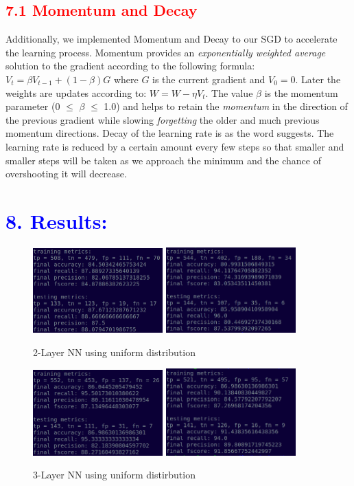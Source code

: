 \documentclass[a4paper,10pt,twocolumn]{article}
\begin{document}
\subsection*{\textcolor{red}{7.1 Momentum and Decay}}
Additionally, we implemented Momentum and Decay to our SGD to accelerate the learning process. Momentum provides an \textit{exponentially weighted average} solution to the gradient according to the following formula: $V_t = \beta V_{t-1} + (1 - \beta)G$ where $G$ is the current gradient and $V_0 = 0$. Later the weights are updates according to: $W = W - \eta V_t$. The value $\beta$ is the momentum parameter (0 $\leq$ $\beta$ $\leq$ 1.0) and helps to retain the \textit{momentum} in the direction of the previous gradient while slowing \textit{forgetting} the older and much previous momentum directions. Decay of the learning rate is as the word suggests. The learning rate is reduced by a certain amount every few steps so that smaller and smaller steps will be taken as we approach the minimum and the chance of overshooting it will decrease.

\newpage
\onecolumn
\section*{\textcolor{blue}{8. Results:}}
\begin{figure}[h!]
\centering
\includegraphics[scale=1.0, width=5cm]{Fig1.png}
\includegraphics[scale=1.0, width=5cm]{Fig2.png}
\caption*{2-Layer NN using uniform distribution}
\end{figure}

\begin{figure}[h!]
\centering
\includegraphics[scale=1.0, width=5cm]{Fig3.png}
\includegraphics[scale=1.0, width=5cm]{Fig4.png}
\caption*{3-Layer NN using uniform distirbution}
\end{figure}
\end{document}
